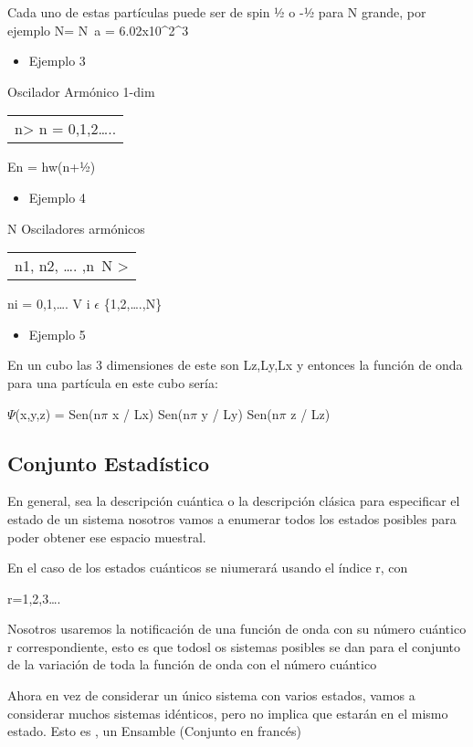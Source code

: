\documentclass[11pt]{article}
\begin{document}
Cada uno de estas partículas puede ser de spin ½ o -½ para N grande,
por ejemplo N= N a = 6.02x10^2^3
\begin{itemize}
\item Ejemplo 3
\end{itemize}
Oscilador Armónico 1-dim
\begin{center}
\begin{tabular}{l}
n> n = 0,1,2\ldots{}..\\
\end{tabular}
\end{center}
En = hw(n+½)
\begin{itemize}
\item Ejemplo 4
\end{itemize}
N Osciladores armónicos
\begin{center}
\begin{tabular}{l}
n1, n2, \ldots{}. ,n N >\\
\end{tabular}
\end{center}
ni = 0,1,\ldots{}.
V i $\epsilon$ \{1,2,\ldots{}.,N\}
\begin{itemize}
\item Ejemplo 5
\end{itemize}
En un cubo las 3 dimensiones de este son Lz,Ly,Lx y entonces la
función de onda para una partícula en este cubo sería:

$\Psi$(x,y,z) = Sen(n$\pi$ x / Lx) Sen(n$\pi$ y / Ly) Sen(n$\pi$ z / Lz)

\subsection{Conjunto Estadístico}
\label{sec-1-2}

En general, sea la descripción cuántica o la descripción clásica para
especificar el estado de un sistema nosotros vamos a enumerar todos
los estados posibles para poder obtener ese espacio muestral.

En el caso de los estados cuánticos se niumerará usando el índice r, con


r=1,2,3\ldots{}.

Nosotros usaremos la notificación de una función de onda con su número
cuántico r correspondiente, esto es que todosl os sistemas posibles se
dan para el conjunto de la variación de toda la función de onda con el
número cuántico

Ahora en vez de considerar un único sistema con varios estados, vamos
a considerar muchos sistemas idénticos, pero no implica que estarán en
el mismo estado. Esto es , un Ensamble (Conjunto en francés)
\end{document}
